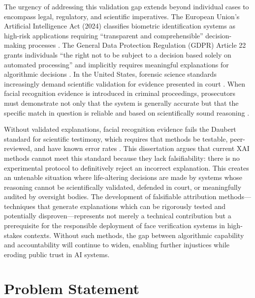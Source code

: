 The urgency of addressing this validation gap extends beyond individual cases to encompass legal, regulatory, and scientific imperatives. The European Union's Artificial Intelligence Act (2024) classifies biometric identification systems as high-risk applications requiring ``transparent and comprehensible'' decision-making processes \cite{euaiact2024}. The General Data Protection Regulation (GDPR) Article 22 grants individuals ``the right not to be subject to a decision based solely on automated processing'' and implicitly requires meaningful explanations for algorithmic decisions \cite{gdpr2016,wachter2017right}. In the United States, forensic science standards increasingly demand scientific validation for evidence presented in court \cite{nrc2009strengthening}. When facial recognition evidence is introduced in criminal proceedings, prosecutors must demonstrate not only that the system is generally accurate but that the specific match in question is reliable and based on scientifically sound reasoning \cite{fed702}.

Without validated explanations, facial recognition evidence fails the Daubert standard for scientific testimony, which requires that methods be testable, peer-reviewed, and have known error rates \cite{daubert1993}. This dissertation argues that current XAI methods cannot meet this standard because they lack falsifiability: there is no experimental protocol to definitively reject an incorrect explanation. This creates an untenable situation where life-altering decisions are made by systems whose reasoning cannot be scientifically validated, defended in court, or meaningfully audited by oversight bodies. The development of falsifiable attribution methods---techniques that generate explanations which can be rigorously tested and potentially disproven---represents not merely a technical contribution but a prerequisite for the responsible deployment of face verification systems in high-stakes contexts. Without such methods, the gap between algorithmic capability and accountability will continue to widen, enabling further injustices while eroding public trust in AI systems.

\section{Problem Statement}
\label{sec:problem_statement}

